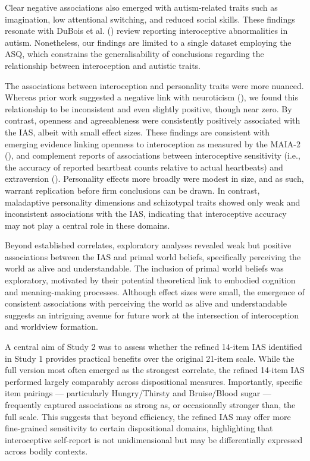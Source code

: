 \documentclass[
  jou,
  floatsintext,
  longtable,
  nolmodern,
  notxfonts,
  notimes,
  colorlinks=true,linkcolor=blue,citecolor=blue,urlcolor=blue]{apa7}
\begin{document}
Clear negative associations also emerged with autism-related traits such
as imagination, low attentional switching, and reduced social skills.
These findings resonate with DuBois et al.
() review reporting interoceptive
abnormalities in autism. Nonetheless, our findings are limited to a
single dataset employing the ASQ, which constrains the generalisability
of conclusions regarding the relationship between interoception and
autistic traits.

The associations between interoception and personality traits were more
nuanced. Whereas prior work suggested a negative link with neuroticism
(), we found this
relationship to be inconsistent and even slightly positive, though near
zero. By contrast, openness and agreeableness were consistently
positively associated with the IAS, albeit with small effect sizes.
These findings are consistent with emerging evidence linking openness to
interoception as measured by the MAIA-2
(), and
complement reports of associations between interoceptive sensitivity
(i.e., the accuracy of reported heartbeat counts relative to actual
heartbeats) and extraversion
().
Personality effects more broadly were modest in size, and as such,
warrant replication before firm conclusions can be drawn. In contrast,
maladaptive personality dimensions and schizotypal traits showed only
weak and inconsistent associations with the IAS, indicating that
interoceptive accuracy may not play a central role in these domains.

Beyond established correlates, exploratory analyses revealed weak but
positive associations between the IAS and primal world beliefs,
specifically perceiving the world as alive and understandable. The
inclusion of primal world beliefs was exploratory, motivated by their
potential theoretical link to embodied cognition and meaning-making
processes. Although effect sizes were small, the emergence of consistent
associations with perceiving the world as alive and understandable
suggests an intriguing avenue for future work at the intersection of
interoception and worldview formation.

A central aim of Study 2 was to assess whether the refined 14-item IAS
identified in Study 1 provides practical benefits over the original
21-item scale. While the full version most often emerged as the
strongest correlate, the refined 14-item IAS performed largely
comparably across dispositional measures. Importantly, specific item
pairings --- particularly Hungry/Thirsty and Bruise/Blood sugar ---
frequently captured associations as strong as, or occasionally stronger
than, the full scale. This suggests that beyond efficiency, the refined
IAS may offer more fine-grained sensitivity to certain dispositional
domains, highlighting that interoceptive self-report is not
unidimensional but may be differentially expressed across bodily
contexts.
\end{document}
